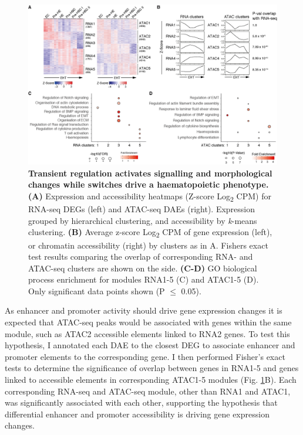 \begin{figure}[htbp]
    \centering
    \includegraphics[width=\textwidth,height=\textheight,keepaspectratio]{figures/chapter3/ch3_clusters.png}
    \caption[{Transient regulation activates signalling and morphological changes while switches drive a haematopoietic phenotype.}]
    {\textbf{Transient regulation activates signalling and morphological changes while switches drive a haematopoietic phenotype.} 
    \textbf{(A)} Expression and accessibility heatmaps (Z-score Log\textsubscript{2} CPM) for RNA-seq DEGs  (left) and ATAC-seq DAEs (right). Expression grouped by hierarchical clustering, and accessibility by \textit{k}-means clustering. 
    \textbf{(B)} Average z-score Log\textsubscript{2} CPM of gene expression (left), or chromatin accessibility (right) by clusters as in A. Fishers exact test results comparing the overlap of corresponding RNA- and ATAC-seq clusters are shown on the side. 
    \textbf{(C-D)} GO biological process enrichment for modules RNA1-5 (C) and ATAC1-5 (D). Only significant data points shown (P $\leq$ 0.05).
    }
    \label{fig:ch3_clusters}
\end{figure}

As enhancer and promoter activity should drive gene expression changes it is expected that ATAC-seq peaks would be associated with genes within the same module, such as ATAC2 accessible elements linked to RNA2 genes. To test this hypothesis, I annotated each DAE to the closest DEG to associate enhancer and promoter elements to the corresponding gene. I then performed Fisher's exact tests to determine the significance of overlap between genes in RNA1-5 and genes linked to accessible elements in corresponding ATAC1-5 modules (Fig. \ref{fig:ch3_clusters}B). Each corresponding RNA-seq and ATAC-seq module, other than RNA1 and ATAC1, was significantly associated with each other, supporting the hypothesis that differential enhancer and promoter accessibility is driving gene expression changes.


